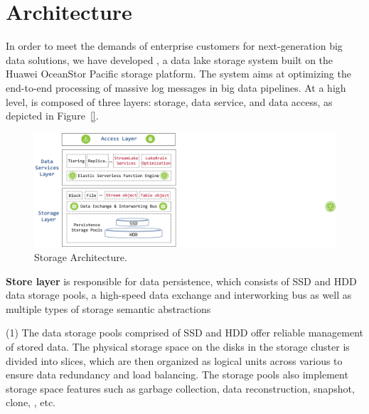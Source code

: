 \section{Architecture} 
\label{sec:archi}


In order to meet the demands of enterprise customers for next-generation big data solutions, we have developed \sys, a data lake storage system built on the Huawei OceanStor Pacific storage platform. The system aims at optimizing the end-to-end processing of massive log messages in big data pipelines. At a high level, \sys is composed of three layers: storage, data service, and data access, as depicted in Figure~\ref{}.



\begin{figure}[!t]
	\centering
	\hspace{2.5em}
	\includegraphics[scale=0.35]{figures/archi}
	\vspace{-1em}
	\caption{\sys Storage Architecture.}
	\label{fig:archi}
	\vspace{-1em}
\end{figure}

\noindent \textbf{Store layer} is responsible for data persistence, which consists of SSD and HDD data storage pools, a high-speed data exchange and interworking bus as well as multiple types of storage semantic abstractions 


(1) The data storage pools comprised of SSD and HDD offer reliable management of stored data.
The physical storage space on the disks in the storage cluster is divided into slices, which are then organized as logical units across various  to ensure data redundancy and load balancing. The storage pools also implement storage space features such as garbage collection, data reconstruction, snapshot, clone, , etc. 

